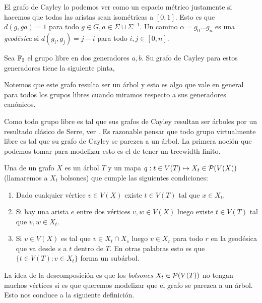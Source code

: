 \documentclass[tesis.tex]{subfiles}
\begin{document}
El grafo de Cayley lo podemos ver como un espacio métrico justamente si hacemos que todas las aristas sean isométricas a $[0,1]$. 
Esto es que $d(g,ga) = 1$ para todo $g \in G, a \in \Sigma \cup \Sigma^{-1}$. 
Un camino $\alpha = g_0 \dots g_n$ es una \emph{geodésica} si $d(g_i,g_j) = j-i$ para todo $i,j \in [0,n]$.

\begin{ej}
	Sea $\Bbb F_2$ el grupo libre en dos generadores $a,b$. Su grafo de Cayley para estos generadores tiene la siguiente pinta,
	\bigskip
	
	
	 Notemos que este grafo resulta ser un árbol y esto es algo que vale en general para todos los grupos libres cuando miramos respecto a sus generadores canónicos.
\end{ej}

Como todo grupo libre es tal que sus grafos de Cayley resultan ser árboles por un resultado clásico de Serre, ver \cite{}.
Es razonable pensar que todo grupo virtualmente libre es tal que su grafo de Cayley se parezca a un árbol. 
La primera noción que podemos tomar para modelizar esto es el de tener un treewidth finito.

\begin{deff}\label{desc-arbol}
	 Una  de un grafo $X$ es un árbol $T$ y un mapa $q:t \in V(T) \mapsto X_t \in {\cal P}(V(X))$ (llamaremos a $X_t$ bolsones) que cumple las siguientes condiciones:
	\begin{enumerate}
		\item Dado cualquier vértice $v \in V(X)$ existe $t \in V(T)$ tal que $x \in X_t$. 
		\item Si hay una arista $e$ entre dos vértices $v,w \in V(X)$ luego existe $t \in V(T)$ tal que $v,w \in X_t$.
		\item Si $v \in V(X)$ es tal que $v \in X_t \cap X_s$ luego $v \in X_r$ para todo $r$ en la geodésica que va desde $s$ a $t$ dentro de $T$. En otras palabras esto es que $\{ t \in V(T) :  v \in X_t \}$ forma un subárbol. 
	\end{enumerate} 
\end{deff}
\smallskip

La idea de la descomposición es que los \emph{bolsones} $X_t \in {\cal P}(V(T))$ no tengan muchos vértices si es que queremos modelizar que el grafo se parezca a un árbol. Esto nos conduce a la siguiente definición.
\end{document}
